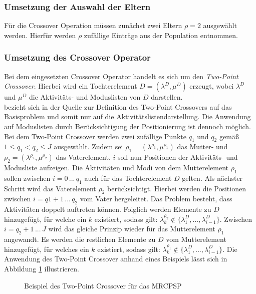 \subsubsection*{Umsetzung der Auswahl der Eltern}
Für die Crossover Operation müssen zunächst zwei Eltern $\rho = 2$ ausgewählt werden. Hierfür werden $\rho$ zufällige Einträge aus der Population entnommen. 

\subsubsection*{Umsetzung des Crossover Operator}
Bei dem eingesetzten Crossover Operator handelt es sich um den \textit{Two-Point Crossover}. Hierbei wird ein Tochterelement $D = (\lambda^D, \mu^D)$ erzeugt, wobei $\lambda^D$ und $\mu^D$ die Aktivitäts- und Moduslisten von $D$ darstellen. \\

\cite{hartmann_competitive_1998} bezieht sich in der Quelle zur Definition des Two-Point Crossovers auf das Basisproblem und somit nur auf die Aktivitätslistendarstellung. Die Anwendung auf Moduslisten durch Berücksichtigung der Positionierung ist dennoch möglich. Bei dem Two-Point Crossover werden zwei zufällige Punkte $q_1$ und $q_2$ gemäß $1 \leq q_1 < q_2 \leq J$ ausgewählt. Zudem sei $\rho_1 = (\lambda^{\rho_1}, \mu^{\rho_1})$ das Mutter- und $\rho_2 = (\lambda^{\rho_2}, \mu^{\rho_2})$ das Vaterelement. $i$ soll nun Positionen der Aktivitäts- und Modusliste aufzeigen. Die Aktivitäten und Modi von dem Mutterelement $\rho_1$ sollen zwischen $i = 0 \, ... \, q_1$ auch für das Tochterelement $D$ gelten. Als nächster Schritt wird das Vaterelement $\rho_2$ berücksichtigt. Hierbei werden die Positionen zwischen $i = q1 + 1 \, ... \, q_2$ vom Vater hergeleitet. Das Problem besteht, dass Aktivitäten doppelt auftreten können. Folglich werden Elemente zu $D$ hinzugefügt, für welche ein $k$ existiert, sodass gilt: $\lambda^{\rho_2}_k \notin \{ \lambda^D_1, ..., \lambda^D_{i-1} \}$. Zwischen $i = q_2 + 1 \, ... \, J$ wird das gleiche Prinzip wieder für das Mutterelement $\rho_1$ angewandt. Es werden die restlichen Elemente zu $D$ vom Mutterelement hinzugefügt, für welches ein $k$ existiert, sodass gilt: $\lambda^{\rho_1}_k \notin \{ \lambda^D_1, ..., \lambda^D_{i-1} \}$. Die Anwendung des Two-Point Crossover anhand eines Beispiels lässt sich in Abbildung \ref{img:twopointcrossover} illustrieren. \cite[vgl.][S. 5]{hartmann_competitive_1998}

\begin{figure}[H]
    \centering
    \noindent{}
    \caption{Beispiel des Two-Point Crossover für das MRCPSP} 
    \label{img:twopointcrossover}
\end{figure}


